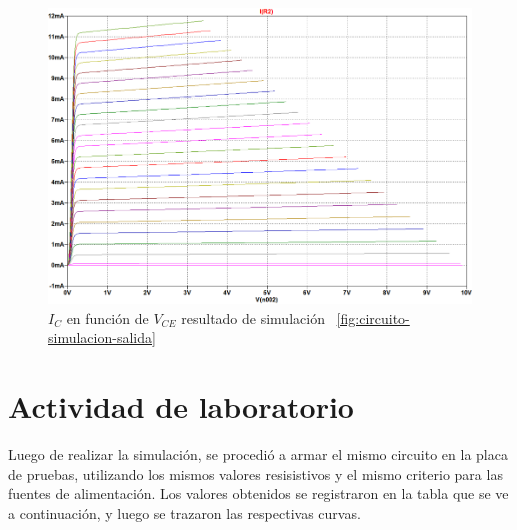 \documentclass[chaptersright]{informeutn}
\begin{document}
      \begin{figure}[H]
          \centering
          \includegraphics[width=1\textwidth, keepaspectratio]{pictures/curva-simulacion-salida.png}
          \caption{$I_C$ en función de $V_{CE}$ resultado de simulación 
          ~\ref{fig:circuito-simulacion-salida}}
          \label{fig:curva-simulacion-salida}
      \end{figure}

  \section{Actividad de laboratorio}
  Luego de realizar la simulación, se procedió a armar el mismo circuito
  en la placa de pruebas, utilizando los mismos valores resisistivos y el
  mismo criterio para las fuentes de alimentación. Los valores obtenidos
  se registraron en la tabla que se ve a continuación, y luego se trazaron
  las respectivas curvas.
    
\end{document}
